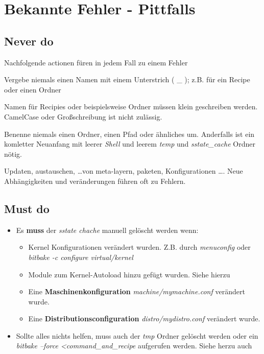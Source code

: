 
\chapter{Bekannte Fehler - Pittfalls}%
\label{cha:bekannte_fehler}


\section{Never do}%
\label{sec:never_do}

Nachfolgende actionen füren in jedem Fall zu einem Fehler

\begin{description}
    \item[Unterstrich \glqq \_ \grqq im Namen]  Vergebe niemals einen Namen mit
        einem Unterstrich ( \_ ); z.B. für ein Recipe oder einen Ordner
    \item[kein CamelCase] Namen für Recipies oder beispielsweise Ordner müssen
        klein geschreiben werden. CamelCase oder Großschreibung ist nicht
        zulässig.
    \item[Umbenennung von Dateien oder Pfaden] Benenne niemals einen Ordner,
        einen Pfad oder ähnliches um. Anderfalls ist ein komletter Neuanfang mit
        leerer \textit{Shell} und leerem \textit{temp}
        und \textit{sstate\_cache} Ordner nötig.
    \item Updaten, austauschen, \ldots von meta-layern, paketen, Konfigurationen
        \ldots. Neue Abhängigkeiten und veränderungen führen oft zu Fehlern.
\end{description}


\section{Must do}%
\label{sec:must_do}

\begin{itemize}
    \item Es \textbf{muss} der \textit{sstate chache} manuell gelöscht werden
        wenn:
        \begin{itemize}
            \item Kernel Konfigurationen verändert wurden. Z.B. durch
                \textit{menuconfig} oder \textit{bitbake -c configure virtual/kernel}
            \item Module zum Kernel-Autoload hinzu gefügt wurden. Siehe hierzu
            \item Eine \textbf{Maschinenkonfiguration}
                \textit{machine/mymachine.conf} verändert wurde.
            \item Eine \textbf{Distributionsconfiguration}
                \textit{distro/mydistro.conf} verändert wurde.
        \end{itemize}
    \item Sollte alles nichts helfen, muss auch der \textit{tmp} Ordner gelöscht
        werden oder ein \textit{bitbake --force <command\_and\_recipe}
        aufgerufen werden. Siehe herzu auch 
\end{itemize}


